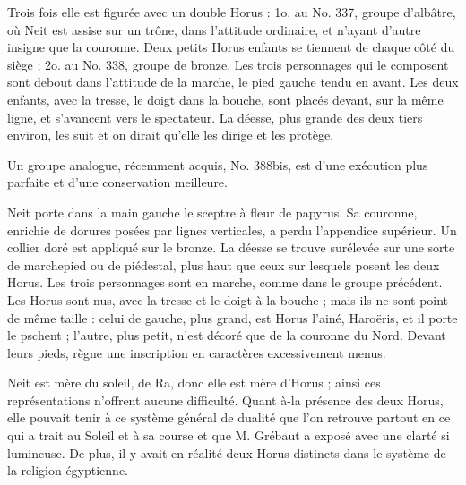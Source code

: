 \documentclass[a4paper, 11pt, oneside]{article}
\begin{document}
Trois fois elle est figurée avec un double Horus : 1o. au No. 337, groupe d'albâtre, où Neit est assise sur un trône, dans l'attitude ordinaire, et n'ayant d'autre insigne que la couronne. Deux petits Horus enfants se tiennent de chaque côté du siège ; 2o. au No. 338, groupe de bronze. Les trois personnages qui le composent sont debout dans l'attitude de la marche, le pied gauche tendu en avant. Les deux enfants, avec la tresse, le doigt dans la bouche, sont placés devant, sur la même ligne, et s'avancent vers le spectateur. La déesse, plus grande des deux tiers environ, les suit et on dirait qu'elle les dirige et les protège.

Un groupe analogue, récemment acquis, No. 388bis, est d'une exécution plus parfaite et d'une conservation meilleure.

Neit porte dans la main gauche le sceptre à fleur de papyrus. Sa couronne, enrichie de dorures posées par lignes verticales, a perdu l'appendice supérieur. Un collier doré est appliqué sur le bronze. La déesse se trouve surélevée sur une sorte de marchepied ou de piédestal, plus haut que ceux sur lesquels posent les deux Horus. Les trois personnages sont en marche, comme dans le groupe précédent. Les Horus sont nus, avec la tresse et le doigt à la bouche ; mais ils ne sont point de même taille : celui de gauche, plus grand, est Horus l'ainé, Haroëris, et il porte le pschent ; l'autre, plus petit, n'est décoré que de la couronne du Nord. Devant leurs pieds, règne une inscription en caractères excessivement menus.

Neit est mère du soleil, de Ra, donc elle est mère d'Horus ; ainsi ces représentations n'offrent aucune difficulté. Quant à-la présence des deux Horus, elle pouvait tenir à ce système général de dualité que l'on retrouve partout en ce qui a trait au Soleil et à sa course et que M. Grébaut a exposé avec une clarté si lumineuse. De plus, il y avait en réalité deux Horus distincts dans le système de la religion égyptienne.
\end{document}
